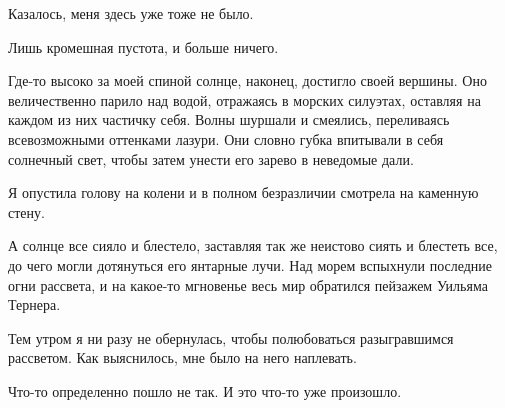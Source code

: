 \documentclass[
]{book}
\begin{document}
Казалось, меня здесь уже тоже не было.

Лишь кромешная пустота, и больше ничего.

Где-то высоко за моей спиной солнце, наконец, достигло своей вершины. Оно величественно парило над водой, отражаясь в морских силуэтах, оставляя на каждом из них частичку себя. Волны шуршали и смеялись, переливаясь всевозможными оттенками лазури. Они словно губка впитывали в себя солнечный свет, чтобы затем унести его зарево в неведомые дали.

Я опустила голову на колени и в полном безразличии смотрела на каменную стену.

А солнце все сияло и блестело, заставляя так же неистово сиять и блестеть все, до чего могли дотянуться его янтарные лучи. Над морем вспыхнули последние огни рассвета, и на какое-то мгновенье весь мир обратился пейзажем Уильяма Тернера.

Тем утром я ни разу не обернулась, чтобы полюбоваться разыгравшимся рассветом. Как выяснилось, мне было на него наплевать.

Что-то определенно пошло не так. И это что-то уже произошло.
\end{document}
